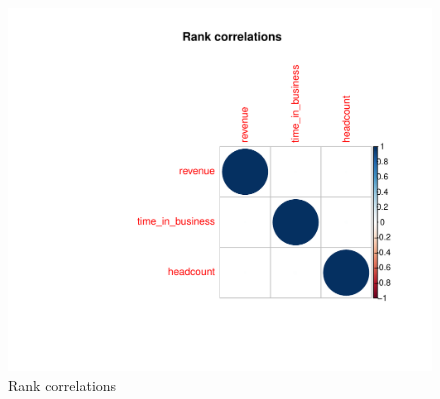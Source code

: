 \documentclass[12pt]{article}\usepackage[]{graphicx}\usepackage[]{color}
\makeatletter
\def\maxwidth{ %
  \ifdim\Gin@nat@width>\linewidth
    \linewidth
  \else
    \Gin@nat@width
  \fi
}
\newenvironment{knitrout}{}{} %
\makeatother
\begin{document}
\begin{figure}[htb]
\begin{center}
\begin{knitrout}\footnotesize
{}\color{fgcolor}
\includegraphics[width=\maxwidth]{figure/unnamed-chunk-8-1} 

\end{knitrout}
\caption{\small Rank correlations}\label{fig:rankcor}
\end{center}
\end{figure}

\clearpage


\end{document}
